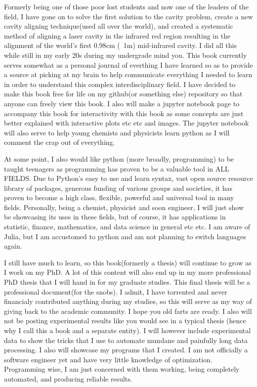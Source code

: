 \documentclass[a4paper]{book}
\begin{document}
	Formerly being one of those poor lost students and now one of the leaders of the field, I have gone on to solve the first solution to the cavity problem, create a new cavity aligning technique(used all over the world), and created a systematic method of aligning a laser cavity in the infrared red region resulting in the alignment of the world's first 0.98cm (~1m) mid-infrared cavity. I did all this while still in my early 20s during my undergrade mind you. This book currently serves somewhat as a personal journal of everthing I have learned so as to provide a source at picking at my brain to help communicate everything I needed to learn in order to understand this complex interdisciplinary field. I have decided to make this book free for life on my github(or something else) repository so that anyone can freely view this book. I also will make a jupyter notebook page to accompany this book for interactivity with this book as some concepts are just better explained with interactive plots etc etc and images. The jupyter notebook will also serve to help young chemists and physicists learn python as I will comment the crap out of everything.
	
	At some point, I also would like python (more broadly, programming) to be taught teenagers as programming has proven to be a valuable tool in ALL FIELDS. Due to Python's easy to use and learn syntax, vast open source resource library of packages,  generous funding of various groups and societies, it has proven to become a high class, flexible, powerful and universal tool in many fields. Personally, being a chemist, physicist and soon engineer, I will just show be showcasing its uses in these fields, but of course, it has applications in statistic, finance, mathematics, and data science in general etc etc. I am aware of Julia, but I am accustomed to python and am not planning to switch languages again.
	
	I still have much to learn, so this book(formerly a thesis) will continue to grow as I work on my PhD. A lot of this content will also end up in my more professional PhD thesis that I will hand in for my graduate studies. This final thesis will be a professional document(for the snobs). I admit, I have torrented and never financialy contributed anything during my studies, so this will serve as my way of giving back to the academic community. I hope you old farts are ready. I also will not be posting experimental results like you would see in a typical thesis (hence why I call this a book and a separate entity). I will however include experimental data to show the tricks that I use to automate mundane and painfully long data processing. I also will showcase my programs that I created. I am not officially a software engineer yet and have very little knowledge of optimization. Programming wise, I am just concerned with them working, being completely automated, and producing reliable results.
\end{document}
